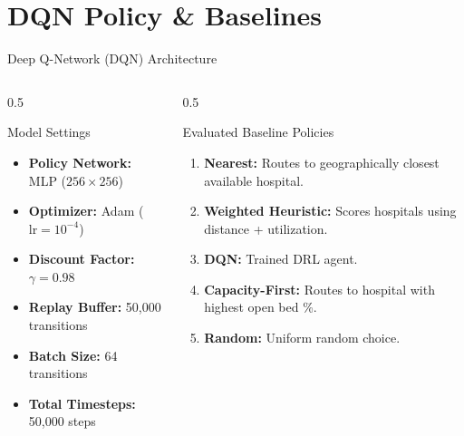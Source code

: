 \documentclass[aspectratio=169, 10pt]{beamer}
\begin{document}
\section{DQN Policy \& Baselines}

\begin{frame}{Deep Q-Network (DQN) Architecture}
    \begin{columns}
        \begin{column}{0.5\textwidth}
            \begin{block}{Model Settings}
                \begin{itemize}
                    \item \textbf{Policy Network:} MLP ($256 \times 256$)
                    \item \textbf{Optimizer:} Adam ($\text{lr} = 10^{-4}$)
                    \item \textbf{Discount Factor:} $\gamma = 0.98$
                    \item \textbf{Replay Buffer:} 50,000 transitions
                    \item \textbf{Batch Size:} 64 transitions
                    \item \textbf{Total Timesteps:} 50,000 steps
                \end{itemize}
            \end{block}
        \end{column}
        \begin{column}{0.5\textwidth}
            \begin{block}{Evaluated Baseline Policies}
                \begin{enumerate}
                    \item \textbf{Nearest:} Routes to geographically closest available hospital.
                    \item \textbf{Weighted Heuristic:} Scores hospitals using distance + utilization.
                    \item \textbf{DQN:} Trained DRL agent.
                    \item \textbf{Capacity-First:} Routes to hospital with highest open bed \%.
                    \item \textbf{Random:} Uniform random choice.
                \end{enumerate}
            \end{block}
        \end{column}
    \end{columns}
\end{frame}
\end{document}

